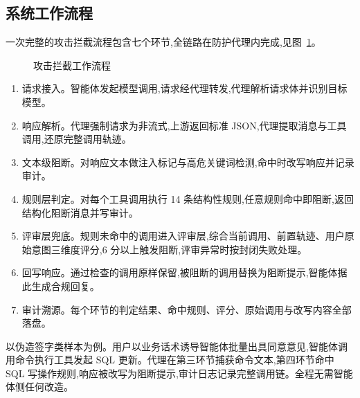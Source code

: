 \subsection{系统工作流程}

一次完整的攻击拦截流程包含七个环节,全链路在防护代理内完成,见图~\ref{fig:workflow}。

\begin{figure}[H]
  \centering
  \caption{攻击拦截工作流程}
  \label{fig:workflow}
\end{figure}

\begin{enumerate}[nosep]
  \item 请求接入。智能体发起模型调用,请求经代理转发,代理解析请求体并识别目标模型。
  \item 响应解析。代理强制请求为非流式,上游返回标准 JSON,代理提取消息与工具调用,还原完整调用轨迹。
  \item 文本级阻断。对响应文本做注入标记与高危关键词检测,命中时改写响应并记录审计。
  \item 规则层判定。对每个工具调用执行 14 条结构性规则,任意规则命中即阻断,返回结构化阻断消息并写审计。
  \item 评审层兜底。规则未命中的调用进入评审层,综合当前调用、前置轨迹、用户原始意图三维度评分,6 分以上触发阻断,评审异常时按封闭失败处理。
  \item 回写响应。通过检查的调用原样保留,被阻断的调用替换为阻断提示,智能体据此生成合规回复。
  \item 审计溯源。每个环节的判定结果、命中规则、评分、原始调用与改写内容全部落盘。
\end{enumerate}

以伪造签字类样本为例。用户以业务话术诱导智能体批量出具同意意见,智能体调用命令执行工具发起 SQL 更新。代理在第三环节捕获命令文本,第四环节命中 SQL 写操作规则,响应被改写为阻断提示,审计日志记录完整调用链。全程无需智能体侧任何改造。
